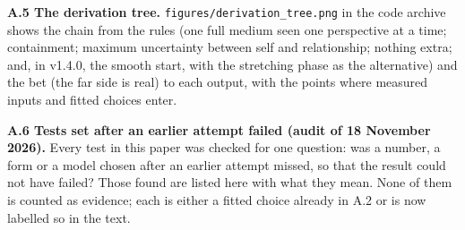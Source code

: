 \documentclass[
  11pt,
]{article}
\begin{document}
\textbf{A.5 The derivation tree.} \texttt{figures/derivation\_tree.png} in the code archive shows the chain from the rules (one full medium seen one perspective at a time; containment; maximum uncertainty between self and relationship; nothing extra; and, in v1.4.0, the smooth start, with the stretching phase as the alternative) and the bet (the far side is real) to each output, with the points where measured inputs and fitted choices enter.

\textbf{A.6 Tests set after an earlier attempt failed (audit of 18 November 2026).} Every test in this paper was checked for one question: was a number, a form or a model chosen after an earlier attempt missed, so that the result could not have failed? Those found are listed here with what they mean. None of them is counted as evidence; each is either a fitted choice already in A.2 or is now labelled so in the text.
\end{document}
